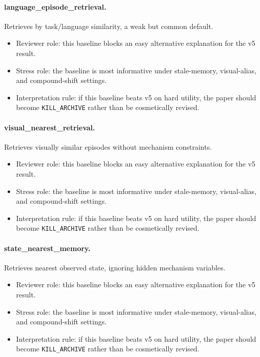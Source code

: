\documentclass{article}
\begin{document}
\paragraph{language\_episode\_retrieval.} Retrieves by task/language similarity, a weak but common default.
\begin{itemize}
\item Reviewer role: this baseline blocks an easy alternative explanation for the v5 result.
\item Stress role: the baseline is most informative under stale-memory, visual-alias, and compound-shift settings.
\item Interpretation rule: if this baseline beats v5 on hard utility, the paper should become \texttt{KILL\_ARCHIVE} rather than be cosmetically revised.
\end{itemize}
\paragraph{visual\_nearest\_retrieval.} Retrieves visually similar episodes without mechanism constraints.
\begin{itemize}
\item Reviewer role: this baseline blocks an easy alternative explanation for the v5 result.
\item Stress role: the baseline is most informative under stale-memory, visual-alias, and compound-shift settings.
\item Interpretation rule: if this baseline beats v5 on hard utility, the paper should become \texttt{KILL\_ARCHIVE} rather than be cosmetically revised.
\end{itemize}
\paragraph{state\_nearest\_memory.} Retrieves nearest observed state, ignoring hidden mechanism variables.
\begin{itemize}
\item Reviewer role: this baseline blocks an easy alternative explanation for the v5 result.
\item Stress role: the baseline is most informative under stale-memory, visual-alias, and compound-shift settings.
\item Interpretation rule: if this baseline beats v5 on hard utility, the paper should become \texttt{KILL\_ARCHIVE} rather than be cosmetically revised.
\end{itemize}
\end{document}

